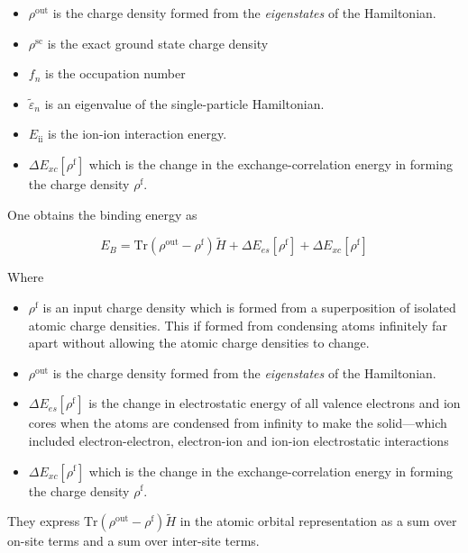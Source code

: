 \documentclass[11pt]{article}
\begin{document}
\begin{enumerate}
\begin{enumerate}
\begin{enumerate}
\begin{itemize}
\item \(\rho^{\text{out}}\) is the charge
density formed from the \emph{eigenstates} of the Hamiltonian.

\item \(\rho^{\text{sc}}\) is the exact ground state charge density

\item \(f_{n}\) is the occupation number

\item \(\tilde{\varepsilon}_{n}\) is an eigenvalue of the single-particle
Hamiltonian.

\item \(E_{\text{ii}}\) is the ion-ion interaction energy.

\item \(\Delta E_{xc}[\rho^{\text{f}}]\)  which is the change in the exchange-correlation energy in forming the charge
density \(\rho^{\text{f}}\).
\end{itemize}

One obtains the binding energy as 
\begin{LaTeX}
\[
E_{B} = \text{Tr}( \rho^{\text{out}} - \rho^{\text{f}} )\widetilde{H} + \Delta E_{es}[\rho^{\text{f}}] + \Delta E_{xc}[\rho^{\text{f}}]
\]
\end{LaTeX}

Where 
\begin{itemize}
\item \(\rho^{\text{f}}\) is an input charge density which is formed
from a superposition of isolated atomic charge densities. This if formed
from condensing atoms infinitely far apart without allowing the atomic
charge densities to change.

\item \(\rho^{\text{out}}\) is the charge
density formed from the \emph{eigenstates} of the Hamiltonian.

\item \(\Delta E_{es}[\rho^{\text{f}}]\) is the change in electrostatic energy
of all valence electrons and ion cores when the atoms are condensed from
infinity to make the solid---which included electron-electron, electron-ion
and ion-ion electrostatic interactions

\item \(\Delta E_{xc}[\rho^{\text{f}}]\)  which is the change in the exchange-correlation energy in forming the charge
density \(\rho^{\text{f}}\).
\end{itemize}

They express \(\text{Tr}(\rho^{\text{out}} - \rho^{\text{f}})\widetilde{H}\) in the atomic
orbital representation as a sum over on-site terms and a sum over inter-site
terms. 



\end{enumerate}
\end{enumerate}
\end{enumerate}
\end{document}
